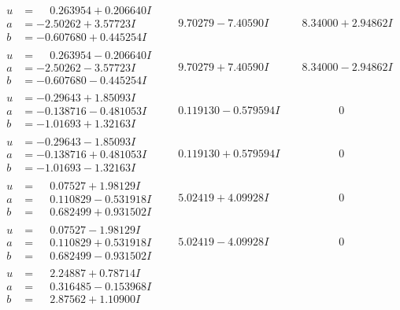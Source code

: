 \documentclass[1p]{elsarticle_modified}
\theoremstyle{definition}
\begin{document}
$$\begin{array}{c|c|c}
\begin{aligned}
u &= \phantom{-}0.263954 + 0.206640 I \\
a &= -2.50262 + 3.57723 I \\
b &= -0.607680 + 0.445254 I\end{aligned}
 & \phantom{-}9.70279 - 7.40590 I & \phantom{-}8.34000 + 2.94862 I \\ \hline\begin{aligned}
u &= \phantom{-}0.263954 - 0.206640 I \\
a &= -2.50262 - 3.57723 I \\
b &= -0.607680 - 0.445254 I\end{aligned}
 & \phantom{-}9.70279 + 7.40590 I & \phantom{-}8.34000 - 2.94862 I \\ \hline\begin{aligned}
u &= -0.29643 + 1.85093 I \\
a &= -0.138716 - 0.481053 I \\
b &= -1.01693 + 1.32163 I\end{aligned}
 & \phantom{-}0.119130 - 0.579594 I & \phantom{-0.000000 } 0 \\ \hline\begin{aligned}
u &= -0.29643 - 1.85093 I \\
a &= -0.138716 + 0.481053 I \\
b &= -1.01693 - 1.32163 I\end{aligned}
 & \phantom{-}0.119130 + 0.579594 I & \phantom{-0.000000 } 0 \\ \hline\begin{aligned}
u &= \phantom{-}0.07527 + 1.98129 I \\
a &= \phantom{-}0.110829 - 0.531918 I \\
b &= \phantom{-}0.682499 + 0.931502 I\end{aligned}
 & \phantom{-}5.02419 + 4.09928 I & \phantom{-0.000000 } 0 \\ \hline\begin{aligned}
u &= \phantom{-}0.07527 - 1.98129 I \\
a &= \phantom{-}0.110829 + 0.531918 I \\
b &= \phantom{-}0.682499 - 0.931502 I\end{aligned}
 & \phantom{-}5.02419 - 4.09928 I & \phantom{-0.000000 } 0 \\ \hline\begin{aligned}
u &= \phantom{-}2.24887 + 0.78714 I \\
a &= \phantom{-}0.316485 - 0.153968 I \\
b &= \phantom{-}2.87562 + 1.10900 I\end{aligned}

\end{array}$$
\end{document}
